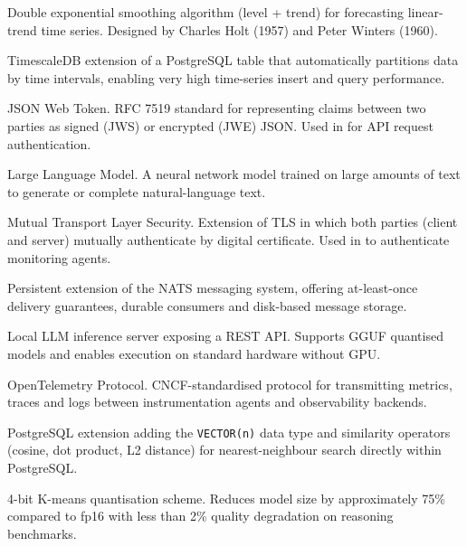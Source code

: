 \begin{description}[leftmargin=3.5cm, style=nextline, font=\bfseries\color{NavyBlue}]
  \item[Holt-Winters]
    Double exponential smoothing algorithm (level + trend) for forecasting
    linear-trend time series. Designed by Charles Holt (1957) and
    Peter Winters (1960).

  \item[Hypertable]
    TimescaleDB extension of a PostgreSQL table that automatically partitions
    data by time intervals, enabling very high time-series insert and query
    performance.

  \item[JWT]
    JSON Web Token. RFC 7519 standard for representing claims between two
    parties as signed (JWS) or encrypted (JWE) JSON. Used in \caimp{} for
    API request authentication.

  \item[LLM]
    Large Language Model. A neural network model trained on large amounts of
    text to generate or complete natural-language text.

  \item[mTLS]
    Mutual Transport Layer Security. Extension of TLS in which both parties
    (client and server) mutually authenticate by digital certificate. Used in
    \caimp{} to authenticate monitoring agents.

  \item[NATS JetStream]
    Persistent extension of the NATS messaging system, offering at-least-once
    delivery guarantees, durable consumers and disk-based message storage.

  \item[Ollama]
    Local LLM inference server exposing a REST API. Supports GGUF quantised
    models and enables execution on standard hardware without GPU.

  \item[OTLP]
    OpenTelemetry Protocol. CNCF-standardised protocol for transmitting metrics,
    traces and logs between instrumentation agents and observability backends.

  \item[pgvector]
    PostgreSQL extension adding the \texttt{VECTOR(n)} data type and similarity
    operators (cosine, dot product, L2 distance) for nearest-neighbour search
    directly within PostgreSQL.

  \item[Q4\_K\_M]
    4-bit K-means quantisation scheme. Reduces model size by approximately 75\%
    compared to fp16 with less than 2\% quality degradation on reasoning benchmarks.


\end{description}
